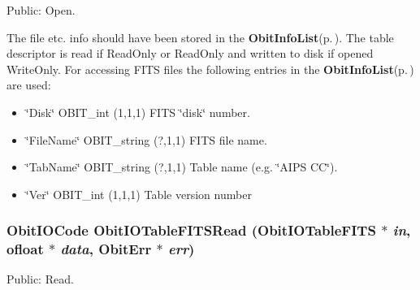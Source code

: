 Public: Open. 

The file etc. info should have been stored in the {\bf Obit\-Info\-List}{\rm (p.\,\pageref{structObitInfoList})}. The table descriptor is read if Read\-Only or Read\-Only and written to disk if opened Write\-Only. For accessing FITS files the following entries in the {\bf Obit\-Info\-List}{\rm (p.\,\pageref{structObitInfoList})} are used: \begin{itemize}
\item \char`\"{}Disk\char`\"{} OBIT\_\-int (1,1,1) FITS \char`\"{}disk\char`\"{} number. \item \char`\"{}File\-Name\char`\"{} OBIT\_\-string (?,1,1) FITS file name. \item \char`\"{}Tab\-Name\char`\"{} OBIT\_\-string (?,1,1) Table name (e.g. \char`\"{}AIPS CC\char`\"{}). \item \char`\"{}Ver\char`\"{} OBIT\_\-int (1,1,1) Table version number 
\end{itemize}
\subsubsection{\setlength{\rightskip}{0pt plus 5cm}Obit\-IOCode Obit\-IOTable\-FITSRead ({\bf Obit\-IOTable\-FITS} $\ast$ {\em in}, {\bf ofloat} $\ast$ {\em data}, {\bf Obit\-Err} $\ast$ {\em err})}\label{ObitIOTableFITS_8h_a12}


Public: Read. 

